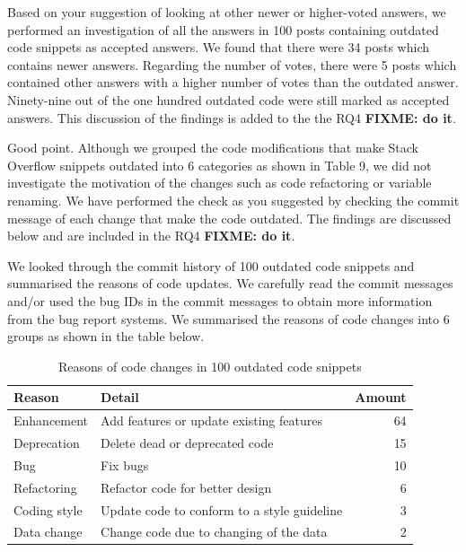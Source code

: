 \documentclass[a4paper,twoside,10pt]{reviewresponse}
\newcommand\FIXME[1]{{\color{red}\textbf{FIXME: #1}}}
\begin{document}
Based on your suggestion of looking at other newer or higher-voted answers, we performed an investigation of all the answers in 100 posts containing outdated code snippets as accepted answers. We found that there were 34 posts which contains newer answers. Regarding the number of votes, there were 5 posts which contained other answers with a higher number of votes than the outdated answer. Ninety-nine out of the one hundred outdated code were still marked as accepted answers. 
This discussion of the findings is added to the the RQ4 \FIXME{do it}.
		
		

Good point. Although we grouped the code modifications that make Stack Overflow snippets outdated into 6 categories as shown in Table 9, we did not investigate the motivation of the changes such as code refactoring or variable renaming. We have performed the check as you suggested by checking the commit message of each change that make the code outdated. The findings are discussed below and are included in the RQ4 \FIXME{do it}.

We looked through the commit history of 100 outdated code snippets and summarised the reasons of code updates. We carefully read the commit messages and/or used the bug IDs in the commit messages to obtain more information from the bug report systems. We summarised the reasons of code changes into 6 groups as shown in the table below.

\begin{table}
	\centering
	\begin{tabular}{llr}
		\toprule
		Reason & Detail & Amount \\
		\midrule
		Enhancement & Add features or update existing features & 64 \\
		Deprecation & Delete dead or deprecated code & 15 \\
		Bug & Fix bugs & 10 \\
		Refactoring & Refactor code for better design & 6 \\
		Coding style & Update code to conform to a style guideline & 3 \\
		Data change & Change code due to changing of the data & 2 \\
		\bottomrule
	\end{tabular}
	\caption{Reasons of code changes in 100 outdated code snippets}
\end{table}
\end{document}

